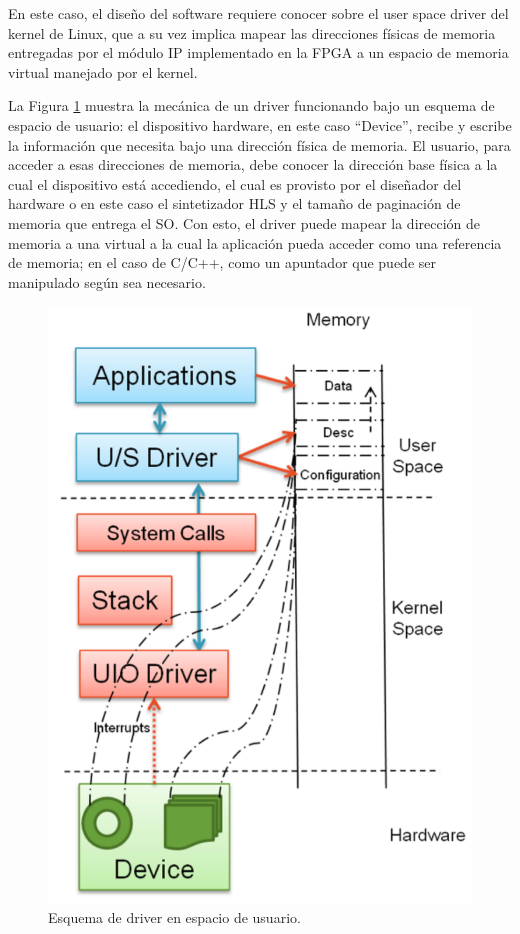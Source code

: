 En este caso, el diseño del software requiere conocer sobre el user space driver del kernel de Linux, que a su vez implica mapear las direcciones físicas de memoria entregadas por el módulo IP implementado en la FPGA a un espacio de memoria virtual manejado por el kernel.

La Figura \ref{fig:userSpaceDriver} muestra la mecánica de un driver funcionando bajo un esquema de espacio de usuario: el dispositivo hardware, en este caso ``Device'', recibe y escribe la información que necesita bajo una dirección física de memoria. El usuario, para acceder a esas direcciones de memoria, debe conocer la dirección base física a la cual el dispositivo está accediendo, el cual es provisto por el diseñador del hardware o en este caso el sintetizador HLS y el tamaño de paginación de memoria que entrega el SO. Con esto, el driver puede mapear la dirección de memoria a una virtual a la cual la aplicación pueda acceder como una referencia de memoria; en el caso de C/C++, como un apuntador que puede ser manipulado según sea necesario.

\begin{figure}[!ht]
	\centering
		\includegraphics[scale=0.5]{Figures/UserSpaceDriver}
	\caption{Esquema de driver en espacio de usuario\cite{userSpaceDriver}.}
	\label{fig:userSpaceDriver}
\end{figure}

